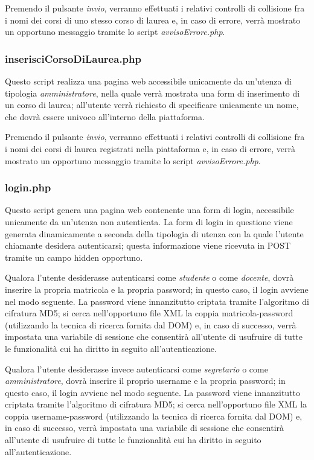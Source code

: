 \documentclass [a4paper,11pt]{book}
\begin{document}
Premendo il pulsante \emph{invio}, verranno effettuati i relativi controlli di collisione fra i nomi dei corsi di uno stesso corso di laurea e, in caso di errore, verrà mostrato un opportuno messaggio tramite lo script \emph{avvisoErrore.php}.

\medskip

\subsubsection{inserisciCorsoDiLaurea.php}

Questo script realizza una pagina web accessibile unicamente da un'utenza di tipologia \emph{amministratore}, nella quale verrà mostrata una form di inserimento di un corso di laurea; all'utente verrà richiesto di specificare unicamente un nome, che dovrà essere univoco all'interno della piattaforma.

Premendo il pulsante \emph{invio}, verranno effettuati i relativi controlli di collisione fra i nomi dei corsi di laurea registrati nella piattaforma e, in caso di errore, verrà mostrato un opportuno messaggio tramite lo script \emph{avvisoErrore.php}.

\medskip

\subsubsection{login.php}

Questo script genera una pagina web contenente una form di login, accessibile unicamente da un'utenza non autenticata. La form di login in questione viene generata dinamicamente a seconda della tipologia di utenza con la quale l'utente chiamante desidera autenticarsi; questa informazione viene ricevuta in POST tramite un campo hidden opportuno. 

Qualora l'utente desiderasse autenticarsi come \emph{studente} o come \emph{docente}, dovrà inserire la propria matricola e la propria password; in questo caso, il login avviene nel modo seguente. La password viene innanzitutto criptata tramite l'algoritmo di cifratura MD5; si cerca nell'opportuno file XML la coppia matricola-password (utilizzando la tecnica di ricerca fornita dal DOM) e, in caso di successo, verrà impostata una variabile di sessione che consentirà all'utente di usufruire di tutte le funzionalità cui ha diritto in seguito all'autenticazione.

Qualora l'utente desiderasse invece autenticarsi come \emph{segretario} o come \emph{amministratore}, dovrà inserire il proprio username e la propria password; in questo caso, il login avviene nel modo seguente. La password viene innanzitutto criptata tramite l'algoritmo di cifratura MD5; si cerca nell'opportuno file XML la coppia username-password (utilizzando la tecnica di ricerca fornita dal DOM) e, in caso di successo, verrà impostata una variabile di sessione che consentirà all'utente di usufruire di tutte le funzionalità cui ha diritto in seguito all'autenticazione.
\end{document}
